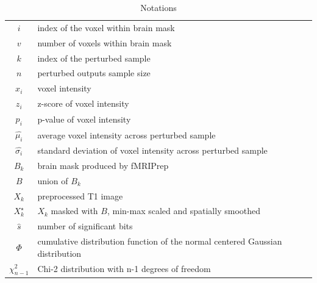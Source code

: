 \documentclass{article}
\newcommand{\fmriprep}{fMRIPrep\xspace}
\begin{document}
\begin{table}
    \centering
    \begin{tabular}{c|l}
        $i$              & index of the voxel within brain mask                                          \\
        $v$              & number of voxels within brain mask                                            \\
        $k$              & index of the perturbed sample                                                 \\
        $n$              & perturbed outputs sample size                                                 \\
        $x_i$            & voxel intensity                                                               \\
        $z_i$            & z-score of voxel intensity                                                    \\
        $p_i$            & p-value of voxel intensity                                                    \\
        $\hat{\mu_i}$    & average voxel intensity across perturbed sample                               \\
        $\hat{\sigma_i}$ & standard deviation of voxel intensity across perturbed sample                 \\
        $B_k$            & brain mask produced by \fmriprep                                              \\
        $B$              & union of $B_k$                                                                \\
        $X_k$            & preprocessed T1 image                                                         \\
        $X_k^{\star}$    & $X_k$ masked with $B$, min-max scaled and spatially smoothed                  \\
        $\hat{s}$        & number of significant bits                                                    \\
        $\Phi$           & cumulative distribution function of the normal centered Gaussian distribution \\
        $\chi^2_{n-1}$   & Chi-2 distribution with n-1 degrees of freedom                                \\
    \end{tabular}
    \caption{Notations}
    \label{tab:notations}
\end{table}
\end{document}
